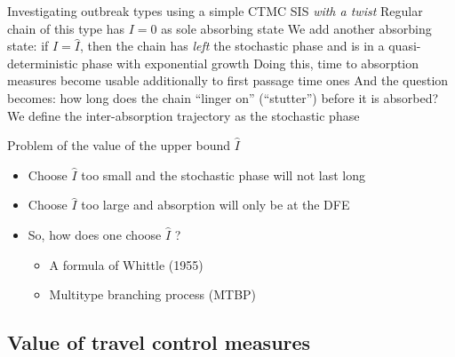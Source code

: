 \documentclass[aspectratio=169]{beamer}\usepackage[]{graphicx}\usepackage[]{xcolor}
\begin{document}
\begin{frame}{Investigating outbreak types using a simple CTMC SIS \emph{with a twist}}
Regular chain of this type has $I=0$ as sole absorbing state
\vfill
We add another absorbing state: if $I=\hat I$, then the chain has \emph{left} the stochastic phase and is in a quasi-deterministic phase with exponential growth
\vfill
Doing this, time to absorption measures become usable additionally to first passage time ones
\vfill
And the question becomes: how long does the chain ``linger on'' (``stutter'') before it is absorbed? We define the inter-absorption trajectory as the stochastic phase
\end{frame}


\begin{frame}{Problem of the value of the upper bound $\hat I$}
  \begin{itemize}
    \item Choose $\hat I$ too small and the stochastic phase will not last long
    \vfill
    \item Choose $\hat I$ too large and absorption will only be at the DFE
    \vfill
    \item So, how does one choose $\hat I$ ?
    \begin{itemize}
      \item A formula of Whittle (1955) \nocite{whittle1955}
      \item Multitype branching process (MTBP)
    \end{itemize}
  \end{itemize}
\end{frame}

\subsection{Value of travel control measures}
\end{document}
